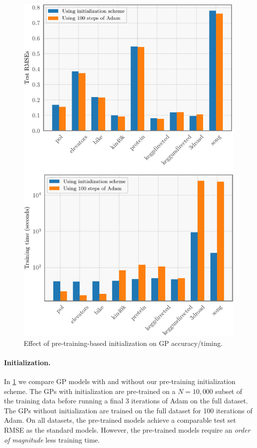 \begin{figure}[t!]
  \centering
  \includegraphics[width=0.75\linewidth]{figures/initialization.pdf}
  \caption[
    Effect of pre-training-based initialization on GP accuracy and timing.
  ]{
    Effect of pre-training-based initialization on GP accuracy/timing.
  }
  \label{fig:initialization}
\end{figure}

\paragraph{Initialization.}
In \cref{fig:initialization} we compare GP models with and without our pre-training initialization scheme.
The GPs with initialization are pre-trained on a $N=10,\!000$ subset of the training data before running a final $3$ iterations of Adam on the full dataset.
The GPs without initialization are trained on the full dataset for 100 iterations of Adam.
On all datasets, the pre-trained models achieve a comparable test set RMSE as the standard models.
However, the pre-trained models require an \emph{order of magnitude} less training time.
